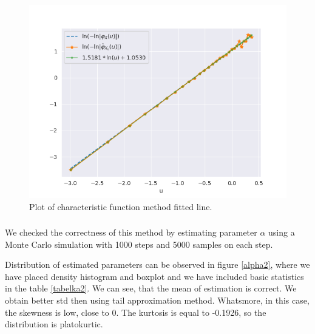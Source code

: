 \documentclass{article}
\begin{document}
		\begin{figure}[H] 
			\centering
			\includegraphics[width=1\linewidth]{images/compare_cf.png}
			\caption{Plot of characteristic function method fitted line.}\label{CF_line}
		\end{figure}
		\subsubsection{}
		
		We checked the correctness of this method by estimating parameter $\alpha$ using a Monte Carlo simulation with 1000 steps and 5000 samples on each step.
		
		Distribution of estimated parameters can be observed in figure \ref{alpha2}, where we have placed density histogram and boxplot and we have included basic statistics in the table \ref{tabelka2}.
		We can see, that the mean of estimation is correct. We obtain better std then using tail approximation method. Whatsmore, in this case, the skewness is low, close to 0. The kurtosis is equal to -0.1926, so the distribution is platokurtic.
		
\end{document}
